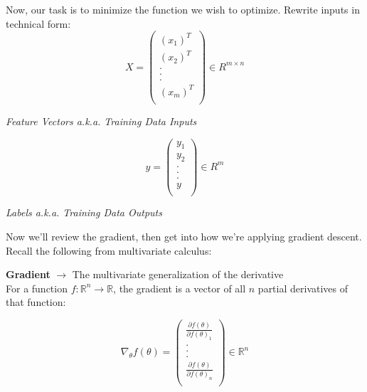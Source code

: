 \documentclass[english, 10pt]{article}
\begin{document}
Now, our task is to minimize the function we wish to optimize. Rewrite inputs in technical form:\\

$$X=\begin{pmatrix}
  (x_1)^T\\ 
  (x_2)^T\\
  .\\
  .\\
  .\\
  (x_m)^T\\
\end{pmatrix} \in R^{m \times n}$$

\begin{center}
\textit{Feature Vectors a.k.a. Training Data Inputs}
\end{center}

$$y=\begin{pmatrix}
  y_1\\ 
  y_2\\
  .\\
  .\\
  .\\
  y\\
\end{pmatrix} \in R^{m}$$

\begin{center}
\textit{Labels a.k.a. Training Data Outputs}\\
\end{center}

\hfill \break Now we'll review the gradient, then get into how we're applying gradient descent. Recall the following from multivariate calculus:
\begin{tcolorbox}[title=Definition:,colframe=red!75!black,colback=red!5!white,arc=0pt,fonttitle=\bfseries]
\textbf{Gradient} $\rightarrow$ The multivariate generalization of the derivative\\

For a function $f:\mathbb{R}^n \rightarrow \mathbb{R}$, the gradient is a vector of all $n$ partial derivatives of that function:

$$ \nabla_{\theta} f(\theta) = \begin{pmatrix}
\frac{\partial f(\theta)}{\partial f(\theta)_1}\\
.\\
.\\
.\\
\frac{\partial f(\theta)}{\partial f(\theta)_n}\\
\end{pmatrix} \in \mathbb{R}^n$$

\end{tcolorbox}
\end{document}
